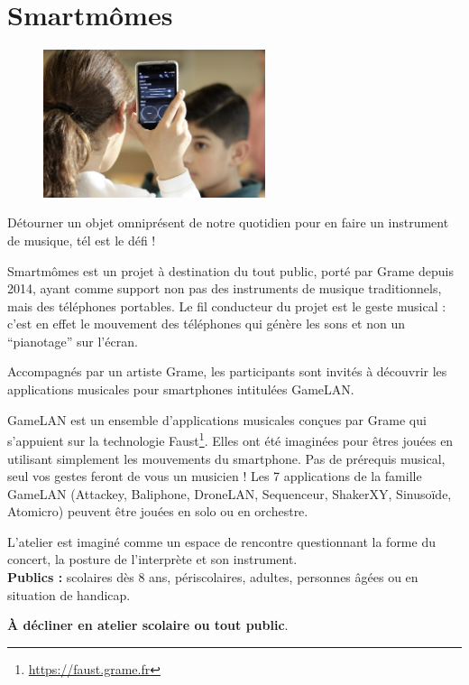 \documentclass[fontsize=12pt]{scrartcl} %
\numberwithin{equation}{section} %
\numberwithin{table}{section} %
\begin{document}
\appendix

\section{Smartmômes}
\label{app:smartmomes}

\begin{figure}
\centering
\includegraphics[width=6.5cm]{img/smartmomes}
\label{fig:sm}
\end{figure}

Détourner un objet omniprésent de notre quotidien pour en faire un instrument de musique, tél est le défi !

Smartmômes est un projet à destination du tout public, porté par Grame depuis 2014, ayant comme support non pas des instruments de musique traditionnels, mais des téléphones portables. Le fil conducteur du projet est le geste musical : c'est en effet le mouvement des téléphones qui génère les sons et non un ``pianotage'' sur l'écran.

Accompagnés par un artiste Grame, les participants sont invités à découvrir les applications musicales pour smartphones intitulées GameLAN.
 
GameLAN est un ensemble d'applications musicales conçues par Grame qui s'appuient sur la technologie Faust\footnote{\url{https://faust.grame.fr}}. Elles ont été imaginées pour êtres jouées en utilisant simplement les mouvements du smartphone. Pas de prérequis musical, seul vos gestes feront de vous un musicien ! Les 7 applications de la famille GameLAN (Attackey, Baliphone, DroneLAN, Sequenceur, ShakerXY, Sinusoïde, Atomicro) peuvent être jouées en solo ou en orchestre.
 
L'atelier est imaginé comme un espace de rencontre questionnant la forme du concert, la posture de l'interprète et son instrument.\\

\noindent
\textbf{Publics :} scolaires dès 8 ans, périscolaires, adultes, personnes âgées ou en situation de handicap. 

\noindent
\textbf{À décliner en atelier scolaire ou tout public}.
\end{document}
